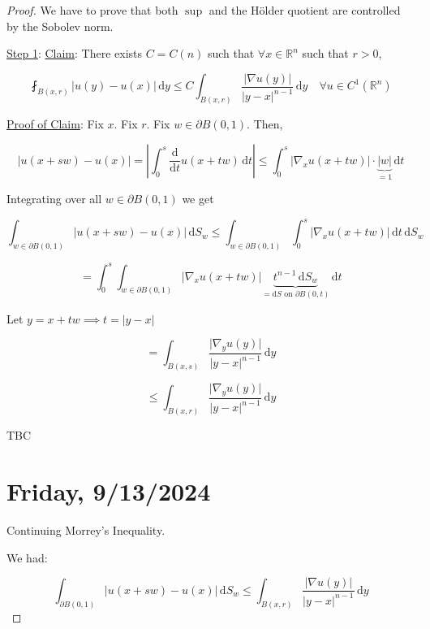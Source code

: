 \documentclass{article}
\theoremstyle{definition}
\begin{document}
\begin{proof}

    We have to prove that both \(\sup\) and the H\"older quotient are controlled by the Sobolev norm.

    \underline{Step 1}: \underline{Claim}: There exists \(C = C(n)\) such that \(\forall x\in \mathbb{R} ^n\) such that \(r > 0\),

    \[
        \fint_{B(x,r)} \vert u(y) - u(x) \vert \, \mathrm{d} y \leq C \int_{B(x,r)} \frac{\vert \nabla u(y) \vert }{\vert y - x \vert ^{n-1}} \, \mathrm{d} y \quad \forall u\in C^1(\mathbb{R}^n)
    \]

    \underline{Proof of Claim}: Fix \(x\). Fix \(r\). Fix \(w\in \partial B(0,1)\). Then,

    \[
        \vert u(x+sw) - u(x) \vert = \left\vert \int_{0}^{s} \frac{\mathrm{d}}{\mathrm{d}t} u(x+tw) \,\mathrm{d}t  \right\vert \leq \int_{0}^{s} \vert \nabla_x u(x + tw) \vert \cdot \underbrace{\vert w \vert}_{=1} \,\mathrm{d}t 
    \]

    Integrating over all \(w \in \partial B(0,1)\) we get

    \[
        \int_{w\in\partial B(0,1)}^{} \vert u(x+sw) - u(x) \vert  \,\mathrm{d}S_w \leq \int_{w\in\partial B(0,1)}^{} \int_{0}^{s} \vert \nabla_x u(x+tw) \vert  \,\mathrm{d}t  \,\mathrm{d}S_w 
    \]

    \[
        = \int_{0}^{s} \int_{w\in\partial B(0,1)}^{} \vert \nabla_x u(x+tw) \vert \underbrace{t^{n-1} \,\mathrm{d}S_w}_{=\mathrm{d} S \text{ on } \partial B(0,t)}  \,\mathrm{d}t 
    \]

    Let \(y = x+tw \implies t = \vert y - x \vert \) 

    \[
        = \int_{B(x,s)}^{} \frac{\vert \nabla_y u(y) \vert}{\vert y - x \vert ^{n-1}} \,\mathrm{d}y
    \]

    \[
        \leq \int_{B(x,r)}^{} \frac{\vert \nabla_y u(y) \vert}{\vert y - x \vert ^{n-1}} \,\mathrm{d}y
    \]

    TBC


\section*{Friday, 9/13/2024}

Continuing Morrey's Inequality.

We had:

\[
    \int_{\partial B(0,1)}^{} \vert u(x+sw) - u(x) \vert  \,\mathrm{d}S_w \leq \int_{B(x,r)}^{} \frac{\vert \nabla u(y) \vert }{\vert y-x \vert^{n-1} } \,\mathrm{d}y 
\]


\end{proof}
\end{document}
